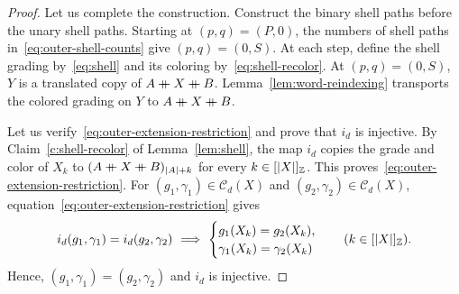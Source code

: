 \begin{proof}
Let us complete the construction.
Construct the binary shell paths before the unary shell paths.
Starting at $(p,q)=(P,0)$, the numbers of shell paths
in~\eqref{eq:outer-shell-counts} give $(p,q)=(0,S)$.
At each step, define the shell grading by~\eqref{eq:shell} and its coloring by~\eqref{eq:shell-recolor}.
At $(p,q)=(0,S)$, $Y$ is a translated copy of $A\mathbin{+\mkern-10mu+} X\mathbin{+\mkern-10mu+} B$.
Lemma~\ref{lem:word-reindexing} transports the colored grading on $Y$ to $A\mathbin{+\mkern-10mu+} X\mathbin{+\mkern-10mu+} B$.

Let us verify~\eqref{eq:outer-extension-restriction} and prove that $i_d$ is injective.
By Claim~\ref{c:shell-recolor} of Lemma~\ref{lem:shell}, the map $i_d$ copies the grade and color of $X_k$ to $(A\mathbin{+\mkern-10mu+} X\mathbin{+\mkern-10mu+} B)_{|A|+k}$ for every $k\in[|X|]_{\mathbb Z}$.
This proves~\eqref{eq:outer-extension-restriction}.
For $(g_1,\gamma_1)\in\mathcal C_d(X)$ and $(g_2,\gamma_2)\in\mathcal C_d(X)$,
equation~\eqref{eq:outer-extension-restriction} gives
\[
 i_d(g_1,\gamma_1)=i_d(g_2,\gamma_2)
 \ \Longrightarrow\ 
 \begin{cases}
 g_1(X_k)=g_2(X_k),\\
 \gamma_1(X_k)=\gamma_2(X_k)
 \end{cases}
 \quad(k\in[|X|]_{\Z}).
\]
Hence, $(g_1,\gamma_1)=(g_2,\gamma_2)$ and $i_d$ is injective.
\end{proof}

